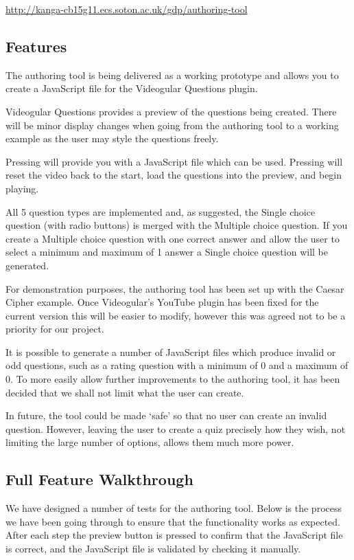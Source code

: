 \documentclass[12pt,a4paper]{article}
\begin{document}
\url{http://kanga-cb15g11.ecs.soton.ac.uk/gdp/authoring-tool}

\subsection{Features}

The authoring tool is being delivered as a working prototype and allows you to create a JavaScript file for the Videogular Questions plugin.

Videogular Questions provides a preview of the questions being created. There will be minor display changes when going from the authoring tool to a working example as the user may style the questions freely.

Pressing  will provide you with a JavaScript file which can be used. Pressing  will reset the video back to the start, load the questions into the preview, and begin playing.

All 5 question types are implemented and, as suggested, the Single choice question (with radio buttons) is merged with the Multiple choice question. If you create a Multiple choice question with one correct answer and allow the user to select a minimum and maximum of 1 answer a Single choice question will be generated.

For demonstration purposes, the authoring tool has been set up with the Caesar Cipher example. Once Videogular's YouTube plugin has been fixed for the current version this will be easier to modify, however this was agreed not to be a priority for our project.

It is possible to generate a number of JavaScript files which produce invalid or odd questions, such as a rating question with a minimum of 0 and a maximum of 0. To more easily allow further improvements to the authoring tool, it has been decided that we shall not limit what the user can create.

In future, the tool could be made `safe' so that no user can create an invalid question. However, leaving the user to create a quiz precisely how they wish, not limiting the large number of options, allows them much more power.

\subsection{Full Feature Walkthrough}

We have designed a number of tests for the authoring tool. Below is the process we have been going through to ensure that the functionality works as expected. After each step the preview button is pressed to confirm that the JavaScript file is correct, and the JavaScript file is validated by checking it manually.
\end{document}
